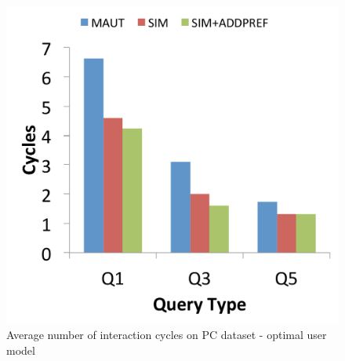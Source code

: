 \begin{figure}[h]
\begin{minipage}{.45\textwidth}
  \includegraphics[width=1\linewidth]{figures-bharath/sim_pc_opt}
  \caption[]{Average number of interaction cycles on PC dataset - optimal user model}
  \label{fig:sim_pc_opt}
\end{minipage}
\end{figure}

